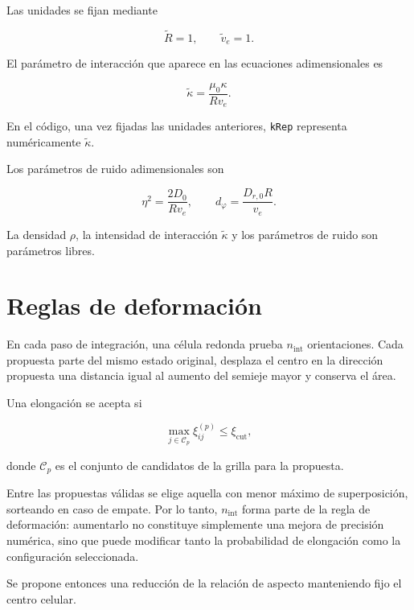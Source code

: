 \documentclass[11pt,a4paper]{article}
\begin{document}
Las unidades se fijan mediante

\begin{equation}
	\widetilde R=1,
	\qquad
	\widetilde v_e=1.
\end{equation}

El parámetro de interacción que aparece en las ecuaciones
adimensionales es

\begin{equation}
	\widetilde\kappa
	=
	\frac{\mu_0\kappa}{Rv_e}.
\end{equation}

En el código, una vez fijadas las unidades anteriores,
\texttt{kRep} representa numéricamente
$\widetilde\kappa$.

Los parámetros de ruido adimensionales son

\begin{equation}
	\eta^2=\frac{2D_0}{Rv_e},
	\qquad
	d_\varphi=\frac{D_{r,0}R}{v_e}.
\end{equation}

La densidad $\rho$, la intensidad de interacción
$\widetilde\kappa$ y los parámetros de ruido son parámetros libres.

\section{Reglas de deformación}

En cada paso de integración, una célula redonda prueba
$n_{\mathrm{int}}$ orientaciones. Cada propuesta parte del mismo
estado original, desplaza el centro en la dirección propuesta una
distancia igual al aumento del semieje mayor y conserva el área.

Una elongación se acepta si

\begin{equation}
	\max_{j\in\mathcal C_p}
	\xi_{ij}^{(p)}
	\leq
	\xi_{\mathrm{cut}},
\end{equation}

donde $\mathcal C_p$ es el conjunto de candidatos de la grilla para
la propuesta.

Entre las propuestas válidas se elige aquella con menor máximo de
superposición, sorteando en caso de empate. Por lo tanto,
$n_{\mathrm{int}}$ forma parte de la regla de deformación:
aumentarlo no constituye simplemente una mejora de precisión numérica,
sino que puede modificar tanto la probabilidad de elongación como la
configuración seleccionada.

Se propone entonces una reducción de la relación de aspecto manteniendo fijo el centro celular.
\end{document}
